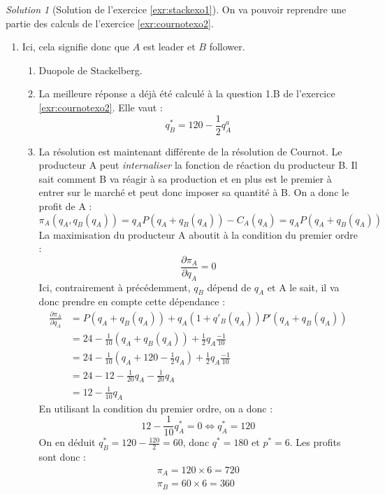 \documentclass[
]{book}
\providecommand{\tightlist}{%
  \setlength{\itemsep}{0pt}\setlength{\parskip}{0pt}}
\theoremstyle{definition}
\theoremstyle{definition}
\theoremstyle{definition}
\theoremstyle{definition}
\theoremstyle{remark}
\newtheorem*{solution}{Solution}
\begin{document}
\begin{solution}[Solution de l'exercice \ref{exr:stackexo1}]

On va pouvoir reprendre une partie des calculs de l'exercice \ref{exr:cournotexo2}.

\begin{enumerate}
\def\labelenumi{\arabic{enumi}.}
\tightlist
\item
  Ici, cela signifie donc que \(A\) est leader et \(B\) follower.

  \begin{enumerate}
  \def\labelenumii{\alph{enumii}.}
  \tightlist
  \item
    Duopole de Stackelberg.
  \item
    La meilleure réponse a déjà été calculé à la question 1.B de l'exercice \ref{exr:cournotexo2}.
    Elle vaut :
    \[q_B^*=120-\frac{1}{2}q_A^a\]
  \item
    La résolution est maintenant différente de la résolution de Cournot.
    Le producteur A peut \emph{internaliser} la fonction de réaction du producteur B.
    Il sait comment B va réagir à sa production et en plus est le premier à entrer sur le marché et peut donc imposer sa quantité à B.
    On a donc le profit de A :
    \[\pi_A(q_A, q_B(q_A))=q_AP(q_A+q_B(q_A))-C_A(q_A)=q_AP(q_A+q_B(q_A))\]
    La maximisation du producteur A aboutit à la condition du premier ordre :
    \[\frac{\partial \pi_A}{\partial q_A}=0\]
    Ici, contrairement à précédemment, \(q_B\) dépend de \(q_A\) et A le sait, il va donc prendre en compte cette dépendance :
    \begin{align*}
    \frac{\partial \pi_A}{\partial q_A}&=P(q_A + q_B(q_A))+q_A(1+q'_B(q_A))P'(q_A+q_B(q_A))\\
    &=24-\frac{1}{10}(q_A+q_B(q_A))+\frac{1}{2}q_A\frac{-1}{10}\\
    &=24-\frac{1}{10}\left(q_A+120-\frac{1}{2}q_A\right)+\frac{1}{2}q_A\frac{-1}{10}\\
    &=24-12-\frac{1}{20}q_A-\frac{1}{20}q_A\\
    &=12-\frac{1}{10}q_A
    \end{align*}
    En utilisant la condition du premier ordre, on a donc :
    \[12-\frac{1}{10}q_A^*=0\Leftrightarrow q_A^*=120\]
    On en déduit \(q_B^*=120-\frac{120}{2}=60\), donc \(q^*=180\) et \(p^*=6\).
    Les profits sont donc :
    \begin{gather*}
    \pi_A=120\times6=720\\
    \pi_B=60\times 6 = 360
    \end{gather*}

\end{enumerate}
\end{enumerate}
\end{solution}
\end{document}
